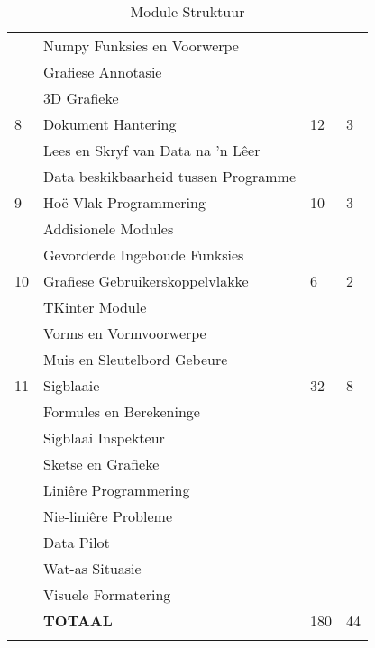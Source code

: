 \begin{longtable}{|p{1.4cm}|p{8.4cm}|p{2.2cm}|p{1.8cm}|}
                & \qquad Numpy Funksies en Voorwerpe           &    &    \\
                & \qquad Grafiese Annotasie                    &    &    \\
                & \qquad 3D Grafieke                           &    &    \\
             \hline
             8  & Dokument Hantering                           & 12 & 3  \\
                & \qquad Lees en Skryf van Data na 'n L\^eer   &    &    \\
                & \qquad Data beskikbaarheid tussen Programme  &    &    \\
             \hline
             9  & Ho\"{e} Vlak Programmering                   & 10 & 3  \\
                & \qquad Addisionele Modules                   &    &    \\
                & \qquad Gevorderde Ingeboude Funksies         &    &    \\
             \hline
             10 & Grafiese Gebruikerskoppelvlakke              & 6  & 2  \\
                & \qquad TKinter Module                        &    &    \\
                & \qquad Vorms en Vormvoorwerpe                &    &    \\
                & \qquad Muis en Sleutelbord Gebeure           &    &    \\
             \hline
             11 & Sigblaaie                                    & 32 & 8  \\
                & \qquad Formules en Berekeninge               &    &    \\
                & \qquad Sigblaai Inspekteur                   &    &    \\
                & \qquad Sketse en Grafieke                    &    &    \\
                & \qquad Lini\^{e}re Programmering             &    &    \\
                & \qquad Nie-lini\^{e}re Probleme              &    &    \\
                & \qquad Data Pilot                            &    &    \\
                & \qquad Wat-as Situasie                       &    &    \\
                & \qquad Visuele Formatering                   &    &    \\
             \hline
                & {\bf TOTAAL}                                 &180 & 44 \\
             \hline
         \caption[Module Struktuur]{Module Struktuur} \label{tab:study_comp}
        \end{longtable}

